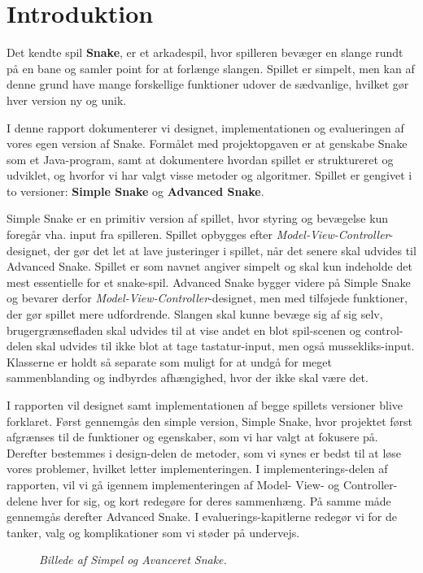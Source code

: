 \section{Introduktion}

Det kendte spil \textbf{Snake}, er et arkadespil, hvor spilleren bevæger en slange rundt på en bane og samler point for at forlænge slangen. Spillet er simpelt, men kan af denne grund have mange forskellige funktioner udover de sædvanlige, hvilket gør hver version ny og unik.
\newline

I denne rapport dokumenterer vi designet, implementationen og evalueringen af vores egen version af Snake. Formålet med projektopgaven er at genskabe Snake som et Java-program, samt at dokumentere hvordan spillet er struktureret og udviklet, og hvorfor vi har valgt visse metoder og algoritmer.
Spillet er gengivet i to versioner: \textbf{Simple Snake} og \textbf{Advanced Snake}.
\newline

Simple Snake er en primitiv version af spillet, hvor styring og bevægelse kun foregår vha. input fra spilleren. Spillet opbygges efter \textit{Model-View-Controller}-designet, der gør det let at lave justeringer i spillet, når det senere skal udvides til Advanced Snake. Spillet er som navnet angiver simpelt og skal kun indeholde det mest essentielle for et snake-spil. Advanced Snake bygger videre på Simple Snake og bevarer derfor \textit{Model-View-Controller}-designet, men med tilføjede funktioner, der gør spillet mere udfordrende. Slangen skal kunne bevæge sig af sig selv, brugergrænsefladen skal udvides til at vise andet en blot spil-scenen og control-delen skal udvides til ikke blot at tage tastatur-input, men også mussekliks-input. Klasserne er holdt så separate som muligt for at undgå for meget sammenblanding og indbyrdes afhængighed, hvor der ikke skal være det.
\newline

I rapporten vil designet samt implementationen af begge spillets versioner blive forklaret. Først gennemgås den simple version, Simple Snake, hvor projektet først afgrænses til de funktioner og egenskaber, som vi har valgt at fokusere på. Derefter bestemmes i design-delen de metoder, som vi synes er bedst til at løse vores problemer, hvilket letter implementeringen. I implementerings-delen af rapporten, vil vi gå igennem implementeringen af Model- View- og Controller-delene hver for sig, og kort redegøre for deres sammenhæng. På samme måde gennemgås derefter Advanced Snake. I evaluerings-kapitlerne redegør vi for de tanker, valg og komplikationer som vi støder på undervejs. 
\begin{figure}[h]
	\centering
	\hspace{0.1\textwidth}
	\caption{\textit{Billede af Simpel og Avanceret Snake.}}
\end{figure}